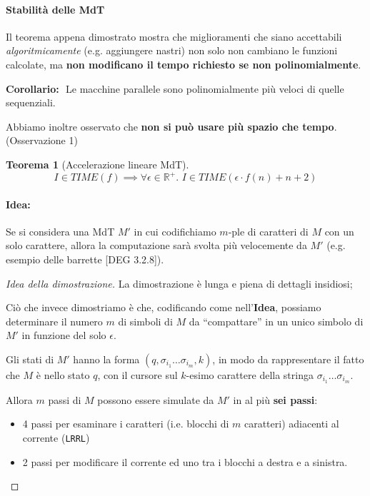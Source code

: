 \documentclass[a4paper,10pt,oneside]{article}
\theoremstyle{break}
\newtheorem{teo}{Teorema}[subsection]
\begin{document}
\paragraph{Stabilità delle MdT} Il teorema appena dimostrato mostra che miglioramenti che siano accettabili \emph{algoritmicamente} (e.g. aggiungere nastri) non solo non cambiano le funzioni calcolate, ma \textbf{non modificano il tempo richiesto se non polinomialmente}.\smallskip

\textbf{Corollario:}\,\, Le macchine parallele sono polinomialmente più veloci di quelle sequenziali.\bigskip


Abbiamo inoltre osservato che \textbf{non si può usare più spazio che tempo}. \hfill (Osservazione 1)

\begin{mdframed}
 \begin{teo}[Accelerazione lineare MdT]
 \[I \in TIME(f) \implies \forall \epsilon \in \mathbb{R}^+ .\,\, I \in TIME (\epsilon \cdot f(n) + n + 2)\]
 \end{teo}

 \dotfill

 \paragraph{Idea:} Se si considera una MdT $M'$ in cui codifichiamo $m$-ple di caratteri di $M$ con un solo carattere, allora la computazione sarà svolta più velocemente da $M'$ (e.g. esempio delle barrette [DEG 3.2.8]).

 \dotfill

 \begin{proof}[Idea della dimostrazione]
 La dimostrazione è lunga e piena di dettagli insidiosi; \smallskip

 Ciò che invece dimostriamo è che, codificando come nell'\textbf{Idea}, possiamo determinare il numero $m$ di simboli di $M$ da ``compattare'' in un unico simbolo di $M'$ in funzione del solo $\epsilon$.\smallskip

 Gli stati di $M'$ hanno la forma $(q, \sigma_{i_1} \hdots \sigma_{i_m}, k)$, in modo da rappresentare il fatto che $M$ è nello stato $q$, con il cursore sul $k$-esimo carattere della stringa $\sigma_{i_1} \hdots \sigma_{i_m}$.\smallskip

 Allora $m$ passi di $M$ possono essere simulate da $M'$ in al più \textbf{sei passi}:
 \begin{itemize}
  \item 4 passi per esaminare i caratteri (i.e. blocchi di $m$ caratteri) adiacenti al corrente (\texttt{LRRL})
  \item 2 passi per modificare il corrente ed uno tra i blocchi a destra e a sinistra.
 \end{itemize}


\end{proof}
\end{mdframed}
\end{document}
